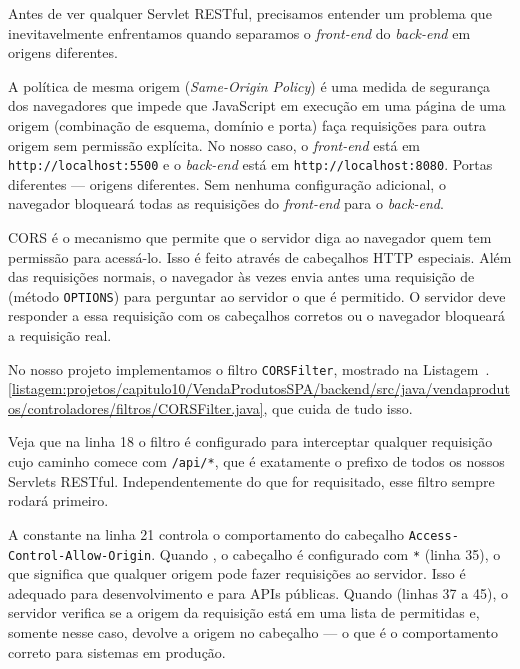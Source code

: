 Antes de ver qualquer Servlet RESTful, precisamos entender um problema que inevitavelmente enfrentamos quando separamos o \textit{front-end} do \textit{back-end} em origens diferentes.

A política de mesma origem (\textit{Same-Origin Policy}) é uma medida de segurança dos navegadores que impede que JavaScript em execução em uma página de uma origem (combinação de esquema, domínio e porta) faça requisições para outra origem sem permissão explícita. No nosso caso, o \textit{front-end} está em \texttt{http://localhost:5500} e o \textit{back-end} está em \texttt{http://localhost:8080}. Portas diferentes --- origens diferentes. Sem nenhuma configuração adicional, o navegador bloqueará todas as requisições do \textit{front-end} para o \textit{back-end}.

CORS é o mecanismo que permite que o servidor diga ao navegador quem tem permissão para acessá-lo. Isso é feito através de cabeçalhos HTTP especiais. Além das requisições normais, o navegador às vezes envia antes uma requisição de  (método \texttt{OPTIONS}) para perguntar ao servidor o que é permitido. O servidor deve responder a essa requisição com os cabeçalhos corretos ou o navegador bloqueará a requisição real.

No nosso projeto implementamos o filtro \texttt{CORSFilter}, mostrado na Listagem~\thechapter.\ref{listagem:projetos/capitulo10/VendaProdutosSPA/backend/src/java/vendaprodutos/controladores/filtros/CORSFilter.java}, que cuida de tudo isso.


Veja que na linha 18 o filtro é configurado para interceptar qualquer requisição cujo caminho comece com \texttt{/api/*}, que é exatamente o prefixo de todos os nossos Servlets RESTful. Independentemente do que for requisitado, esse filtro sempre rodará primeiro.

A constante  na linha 21 controla o comportamento do cabeçalho \texttt{Access-Control-Allow-Origin}. Quando , o cabeçalho é configurado com \texttt{*} (linha 35), o que significa que qualquer origem pode fazer requisições ao servidor. Isso é adequado para desenvolvimento e para APIs públicas. Quando  (linhas 37 a 45), o servidor verifica se a origem da requisição está em uma lista de permitidas e, somente nesse caso, devolve a origem no cabeçalho --- o que é o comportamento correto para sistemas em produção.

